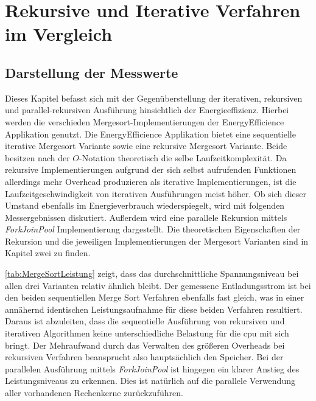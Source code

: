 \chapter{Rekursive und Iterative Verfahren im Vergleich}

\section{Darstellung der Messwerte}
Dieses Kapitel befasst sich mit der Gegenüberstellung der iterativen, rekursiven und parallel-rekursiven Ausführung hinsichtlich der Energieeffizienz. Hierbei werden die verschieden Mergesort-Implementierungen der \glqq EnergyEfficience\grqq{} Applikation genutzt. Die \glqq EnergyEfficience\grqq{} Applikation bietet eine sequentielle iterative Mergesort Variante sowie eine rekursive Mergesort Variante. Beide besitzen nach der $O$-Notation theoretisch die selbe Laufzeitkomplexität. Da rekursive Implementierungen aufgrund der sich selbst aufrufenden Funktionen allerdings mehr Overhead produzieren als iterative Implementierungen, ist die Laufzeitgeschwindigkeit von iterativen Ausführungen meist höher. Ob sich dieser Umstand ebenfalls im Energieverbrauch wiederspiegelt, wird mit folgenden Messergebnissen diskutiert. Außerdem wird eine parallele Rekursion mittels \emph{ForkJoinPool} Implementierung dargestellt. Die theoretischen Eigenschaften der Rekursion und die jeweiligen Implementierungen der Mergesort Varianten sind in Kapitel zwei zu finden.

\autoref{tab:MergeSortLeistung} zeigt, dass das durchschnittliche Spannungsniveau bei allen drei Varianten relativ ähnlich bleibt. Der gemessene Entladungsstrom ist bei den beiden sequentiellen Merge Sort Verfahren ebenfalls fast gleich, was in einer annähernd identischen Leistungsaufnahme für diese beiden Verfahren resultiert. Daraus ist abzuleiten, dass die sequentielle Ausführung von rekursiven und iterativen Algorithmen keine unterschiedliche Belastung für die \ac{cpu} mit sich bringt. Der Mehraufwand durch das Verwalten des größeren Overheads bei rekursiven Verfahren beansprucht also hauptsächlich den Speicher. Bei der parallelen Ausführung mittels \emph{ForkJoinPool} ist hingegen ein klarer Anstieg des Leistungsniveaus zu erkennen. Dies ist natürlich auf die parallele Verwendung aller vorhandenen Rechenkerne zurückzuführen.



